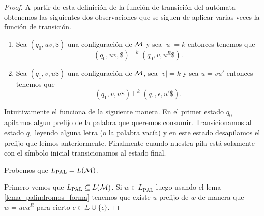 \documentclass[tesis.tex]{subfiles}
\begin{document}
\begin{proof}
	A partir de esta definición de la función de transición del autómata obtenemos las siguientes dos observaciones que se siguen de aplicar varias veces la función de transición.
	
	\begin{enumerate}
		\item 
		Sea $(q_{0},uv, \$)$ una configuración de $\cal M$ y sea $|u| = k$ entonces tenemos que 
		\[
			(q_{0},uv, \$) \vdash^k (q_{0}, v, u^R \$).
		\]
		
		\item Sea $(q_{1},v, u\$)$ una configuración de $\cal M$, sea $|v| = k$ y 
		sea $u = vu'$  entonces tenemos que 
		\[
		(q_{1},v, u\$) \vdash^k (q_{1}, \epsilon, u' \$).
		\]
	\end{enumerate}
	
	
	Intuitivamente el \APND funciona de la siguiente manera. 
	En el primer estado $q_{0}$ apilamos algun prefijo de la palabra que queremos consumir.
	Transicionamos al estado $q_{1}$ leyendo alguna letra (o la palabra vacía) y en este estado desapilamos el prefijo que leímos anteriormente.
	Finalmente cuando nuestra pila está solamente con el símbolo inicial transicionamos	al estado final.
	
	Probemos que $L_{\text{PAL}} = L(\cal M)$.
	
	Primero vemos que $L_{\text{PAL}} \subseteq L(\cal M)$.
	Si $w \in L_{\text{PAL}}$ luego usando el lema \ref{lema_palindromos_forma}
	tenemos que existe $u$ prefijo de $w$ de manera que
	$w = ucu^R$ para cierto $c \in \Sigma \cup \{ \epsilon\}$.
	

\end{proof}
\end{document}
